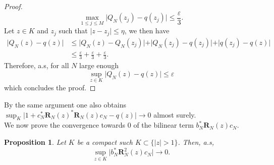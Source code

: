 \documentclass[12pt,a4paper]{amsart}
\theoremstyle{plain} %
\newtheorem{proposition}[theorem]{Proposition}
\begin{document}
\begin{proof}
     \begin{equation*}
         \max_{1\leq j\leq M}\lvert Q_N(z_j)-q(z_j) \lvert \leq \frac{\varepsilon}{3}.
     \end{equation*}
     Let $z \in K$ and $z_j$ such that $\lvert z-z_j \lvert \leq \eta$, we then have 
     \begin{align*}
         \lvert Q_N(z) -q(z)\lvert &\leq \lvert Q_N(z) - Q_N(z_j)\lvert + \lvert Q_N(z_j)-q(z_j)\lvert + \lvert q(z_j)-q(z) \lvert \\
         &\leq \frac{\varepsilon}{3}+\frac{\varepsilon}{3}+\frac{\varepsilon}{3}.
     \end{align*}
     Therefore, a.s, for all $N$ large enough 
     \begin{equation*}
         \sup_{z\in K}\lvert Q_N(z)-q(z) \lvert \leq \varepsilon
     \end{equation*}
     which concludes the proof.
 \end{proof}
By the same argument one also obtains $\sup_K \lvert 1+ c_N^*\mathbf{R}_{N}(z)^*\mathbf{R}_{N}(z)c_N-q(z) \lvert \rightarrow 0$ almost surely.\\
We now prove the convergence towards $0$ of the bilinear term $b_N^*\mathbf{R}_{N}(z)c_N$.
\begin{proposition}
     Let $K$ be a compact such $K \subset \{\lvert z \lvert >1\}$. Then, a.s,
     \begin{equation*}
         \sup_{z\in K}\lvert b_N^*\mathbf{R}^2_{N}(z)c_N\lvert \rightarrow0.
     \end{equation*}
\end{proposition}
\end{document}
